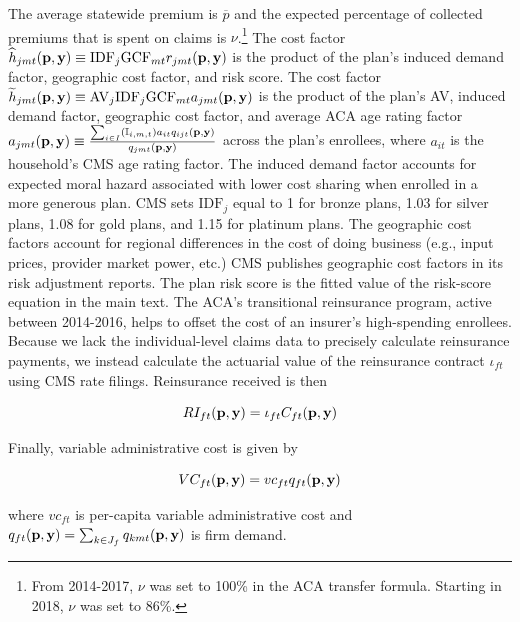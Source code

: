 \documentclass[12pt]{article}
\begin{document}
    
    \noindent The average statewide premium is $\overline{p}$ and the expected percentage of collected premiums that is spent on claims is $\nu$.\footnote{From 2014-2017, $\nu$ was set to 100\% in the ACA transfer formula.  Starting in 2018, $\nu$ was set to 86\%.}  The cost factor $\widehat{h}_{jmt}({\bf p},{\bf y}) \equiv \mathrm{IDF}_j\mathrm{GCF}_{mt}r_{jmt}({\bf p},{\bf y})$ is the product of the plan's induced demand factor,  geographic cost factor, and risk score. The cost factor $\widetilde{h}_{jmt}({\bf p},{\bf y}) \equiv \mathrm{AV}_j\mathrm{IDF}_j\mathrm{GCF}_{mt}a_{jmt}({\bf p},{\bf y})$ is the product of the plan's AV, induced demand factor, geographic cost factor, and average ACA age rating factor $a_{jmt}({\bf p},{\bf y}) \equiv  \frac{\sum_{i \in I} \left(\mathbb{I}_{i,m,t} \right) a_{it} q_{ijt}({\bf p},{\bf y})}{q_{jmt}({\bf p},{\bf y})}$  across the plan's enrollees, where $a_{it}$ is the household's CMS age rating factor. The induced demand factor accounts for expected moral hazard associated with lower cost sharing when enrolled in a more generous plan. CMS sets $\mathrm{IDF}_j$ equal to 1 for bronze plans, 1.03 for silver plans, 1.08 for gold plans, and 1.15 for platinum plans.  The geographic cost factors account for regional differences in the cost of doing business (e.g., input prices, provider market power, etc.)  CMS publishes geographic cost factors in its risk adjustment reports.  The plan risk score is the fitted value of the risk-score equation in the main text.  The ACA's transitional reinsurance program, active between 2014-2016, helps to offset the cost of an insurer's high-spending enrollees.  Because we lack the individual-level claims data to precisely calculate reinsurance payments, we instead calculate the actuarial value of the reinsurance contract $\iota_{ft}$ using CMS rate filings.  Reinsurance received is then

    	\begin{equation*}\label{reins_formula}
			RI_{ft}({\bf p},{\bf y}) = \iota_{ft} C_{ft}({\bf p},{\bf y})
		\end{equation*}

    \noindent Finally, variable administrative cost is given by

        \begin{equation*}
            VC_{ft}({\bf p},{\bf y}) = vc_{ft} q_{ft}({\bf p},{\bf y})
        \end{equation*}
    
    \noindent where $vc_{ft}$ is per-capita variable administrative cost and $q_{ft}({\bf p},{\bf y}) = \sum_{k \in J_f} q_{kmt}({\bf p},{\bf y})$ is firm demand.
    
\end{document}
